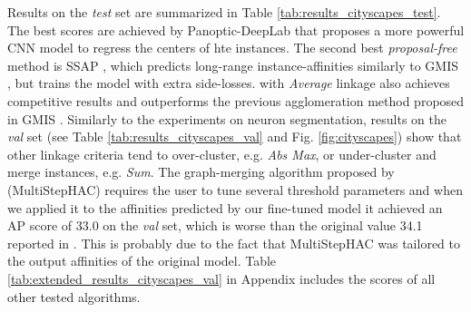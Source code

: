 Results on the \emph{test} set are summarized in Table \ref{tab:results_cityscapes_test}. The best scores are achieved by Panoptic-DeepLab \cite{cheng2019panopticdeeplab} that proposes a more powerful CNN model to regress the centers of hte instances. The second best \emph{proposal-free} method is SSAP \cite{Gao_2019_ICCV}, which predicts long-range instance-affinities similarly to GMIS \cite{liu2018affinity}, but trains the model with extra side-losses. \algname{} with \emph{Average} linkage also achieves competitive results and outperforms the previous agglomeration method proposed in GMIS \cite{liu2018affinity}. Similarly to the experiments on neuron segmentation, results on the \emph{val} set (see Table \ref{tab:results_cityscapes_val} and Fig. \ref{fig:cityscapes}) show that other \algname{} linkage criteria tend to over-cluster, e.g. \emph{Abs Max}, or under-cluster and merge instances, e.g. \emph{Sum}. The graph-merging algorithm proposed by \cite{liu2018affinity} (MultiStepHAC) requires the user to tune several threshold parameters and when we applied it to the affinities predicted by our fine-tuned model it achieved an AP score of 33.0 on the \emph{val} set, which is worse than the original value 34.1 reported in \cite{liu2018affinity}. This is probably due to the fact that MultiStepHAC was tailored to the output affinities of the original model. 
Table \ref{tab:extended_results_cityscapes_val} in Appendix includes the scores of all other tested \algname{} algorithms.

